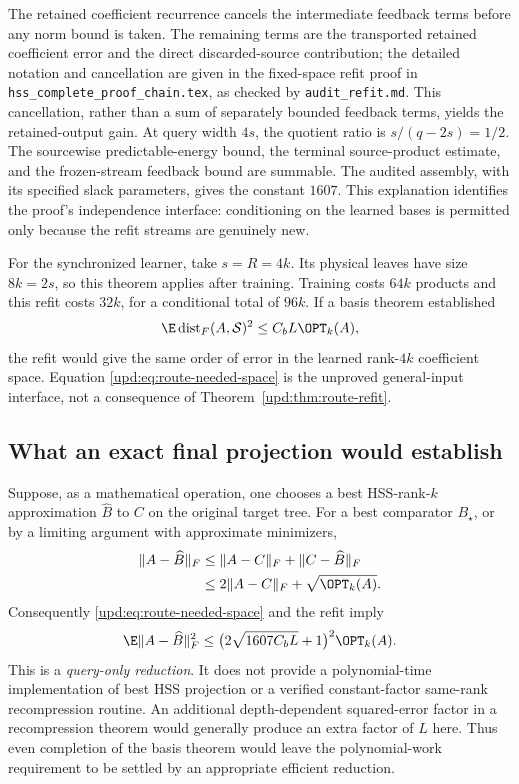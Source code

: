 \documentclass[11pt,oneside,openany,a4paper]{book}
\numberwithin{equation}{chapter}
\theoremstyle{definition}
\theoremstyle{remark}
\newcommand{\sourcefile}[1]{{\small\nolinkurl{#1}}}
\begin{document}
The retained coefficient recurrence cancels the intermediate feedback
terms before any norm bound is taken.  The remaining terms are the
transported retained coefficient error and the direct discarded-source
contribution; the detailed notation and cancellation are given in the
fixed-space refit proof in
\sourcefile{hss_complete_proof_chain.tex}, as checked by
\sourcefile{audit_refit.md}.  This cancellation, rather than a sum of
separately bounded feedback terms, yields the retained-output gain.  At
query width $4s$, the quotient ratio is
$s/(q-2s)=1/2$.  The sourcewise predictable-energy bound, the terminal
source-product estimate, and the frozen-stream feedback bound are
summable.  The audited assembly, with its specified slack parameters,
gives the constant $1607$.  This explanation identifies the proof's
independence interface: conditioning on the learned bases is permitted
only because the refit streams are genuinely new.

For the synchronized learner, take $s=R=4k$.  Its physical leaves have
size $8k=2s$, so this theorem applies after training.  Training costs
$64k$ products and this refit costs $32k$, for a conditional total of
$96k$.  If a basis theorem established
\begin{equation}
 \E\operatorname{dist}_F(A,\mathcal S)^2
 \leq C_b L\OPT_k(A),
 \label{upd:eq:route-needed-space}
\end{equation}
the refit would give the same order of error in the learned rank-$4k$
coefficient space.  Equation \eqref{upd:eq:route-needed-space} is the
unproved general-input interface, not a consequence of
Theorem~\ref{upd:thm:route-refit}.

\subsection{What an exact final projection would establish}

Suppose, as a mathematical operation, one chooses a best HSS-rank-$k$
approximation $\widehat B$ to $C$ on the original target tree.  For a
best comparator $B_\star$, or by a limiting argument with approximate
minimizers,
\begin{align}
 \lVert A-\widehat B\rVert_F
 &\leq \lVert A-C\rVert_F+\lVert C-\widehat B\rVert_F\\
 &\leq2\lVert A-C\rVert_F+\sqrt{\OPT_k(A)}.
 \label{upd:eq:route-offline-reduction}
\end{align}
Consequently \eqref{upd:eq:route-needed-space} and the refit imply
\[
 \E\lVert A-\widehat B\rVert_F^2
 \leq \bigl(2\sqrt{1607C_bL}+1\bigr)^2\OPT_k(A).
\]
This is a \emph{query-only reduction}.  It does not provide a
polynomial-time implementation of best HSS projection or a verified
constant-factor same-rank recompression routine.  An additional
depth-dependent squared-error factor in a recompression theorem would
generally produce an extra factor of $L$ here.  Thus even completion of
the basis theorem would leave the polynomial-work requirement to be
settled by an appropriate efficient reduction.
\end{document}
